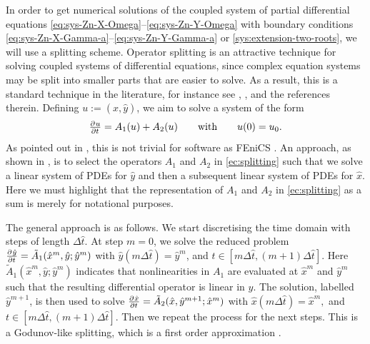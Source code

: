 \documentclass[11pt]{article}
\numberwithin{equation}{section}
\begin{document}
In order to get numerical solutions of the coupled system of partial differential equations \eqref{eq:sys-Zn-X-Omega}--\eqref{eq:sys-Zn-Y-Omega} with boundary conditions \eqref{eq:sys-Zn-X-Gamma-a}--\eqref{eq:sys-Zn-Y-Gamma-a} or \eqref{sys:extension-two-roots}, we will use a splitting scheme.
%
Operator splitting is an attractive technique for solving coupled systems of differential equations, since complex equation systems may be split into smaller parts that are easier to solve.
As a result, this is a standard technique in the literature, for instance see \cite{Farrell-2019}, \cite{Sundnes-2006}, and the references therein. 
Defining \(u:= (\hat{x},\hat{y})\), we aim to solve a system of the form
\begin{equation}
    \label{ec:splitting}
	\pd{u}{t} = A_1(u) + A_2(u) 	\qquad \text{with} \qquad u(0) = u_0.
\end{equation}
As pointed out in \cite{Farrell-2019}, this is not trivial for software as FEniCS \cite{AlnaesBlechta2015a}. 
An approach, as shown in  \cite{Sundnes-2006}, is to select the operators \(A_1\) and \(A_2\) in \eqref{ec:splitting} such that we solve a linear system of PDEs for \(\hat{y}\) and then a subsequent linear system of PDEs for \(\hat{x}\). Here we must highlight that the representation of \(A_1\) and \(A_2\) in \eqref{ec:splitting} as a sum is merely for notational purposes.

The general approach is as follows. We start discretising the time domain with steps of length \(\Delta \hat{t}\). At step \(m = 0\), we solve the reduced problem 
\(
	\pd{\hat{y}}{t} = \tilde{A}_1(\hat{x}^m,\hat{y}; \hat{y}^m) 
\) with 
\( \hat{y}(m\Delta \hat{t}) = \hat{y}^m\),
and \( t\in [m\Delta \hat{t},(m+1)\Delta \hat{t}]\).
Here \(\tilde{A}_1(\hat{x}^m,\hat{y}; \hat{y}^m)\) indicates that nonlinearities in \(A_1\) are evaluated at \(\hat{x}^m\) and \(\hat{y}^m\) such that the resulting differential operator is linear in \(\hat{y}\).
The solution, labelled \(\hat{y}^{m+1}\), is then used to solve 
\(
	\pd{\hat{x}}{t} = \tilde{A}_2(\hat{x},\hat{y}^{m+1}; \hat{x}^m) 
\) with 
\( \hat{x}(m\Delta \hat{t}) = \hat{x}^m, \)
and \( t\in [m\Delta \hat{t},(m+1)\Delta \hat{t}]\). Then we repeat the process for the next steps. This is a Godunov-like splitting, which is a first order approximation \cite{Sundnes-2006}. 
\end{document}
